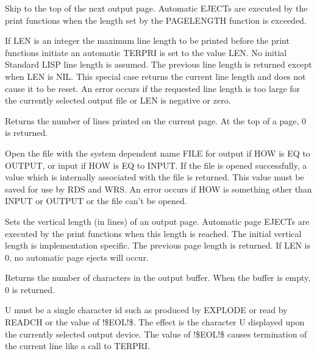 \documentclass[11pt,letterpaper]{book}
\begin{document}
{Skip to the top of the next output page. Automatic EJECTs are
executed by the print functions when the length set by the PAGELENGTH
 function is exceeded.}


{If LEN is an integer the maximum line length to be printed before the
print functions initiate an automatic TERPRI is set to the value LEN.
No initial Standard LISP line length is assumed. The previous line
length is returned except when LEN is NIL. This special case returns
the current line length and does not cause it to be reset. An error
occurs if the requested line length is too large for the currently
selected output file or LEN is negative or zero.

}


{Returns the number of lines printed on the current page. At the top
of a page, 0 is returned. }


{Open the file with the system dependent name FILE for output if HOW
is EQ to OUTPUT, or input if HOW is EQ to INPUT. If the file is
   
opened successfully, a value which is internally associated with the
file is returned. This value must be saved for use by RDS and WRS. An
error occurs if HOW is something other than INPUT or OUTPUT or the
file can't be opened.

}


{Sets the vertical length (in lines) of an output page. Automatic page
EJECTs are executed by the print functions when this length is
reached. The initial vertical length is implementation specific. The
previous page length is returned. If LEN is 0, no automatic page
ejects will occur. }


{Returns the number of characters in the output buffer. When the
buffer is empty, 0 is returned.}


{U must be a single character id such as produced by EXPLODE or read
by READCH or the value of !\$EOL!\$. The effect is the character U
displayed upon the currently selected output device. The value of
!\$EOL!\$ causes termination of the current line like a call to
TERPRI.}
\end{document}
